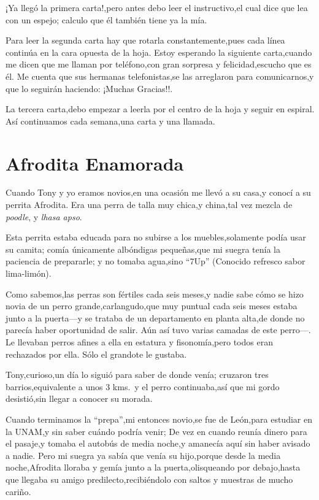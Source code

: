 \documentclass[letterpaper,12pt]{book}
\begin{document}
¡Ya llegó la primera carta!,pero antes debo leer el instructivo,el cual dice que lea con un espejo; calculo que él también tiene ya la mía. 

Para leer la segunda carta hay que rotarla constantemente,pues cada línea continúa en la cara opuesta de la hoja. Estoy esperando la siguiente carta,cuando me dicen que me llaman por teléfono,con gran sorpresa y felicidad,escucho que es él. Me cuenta que sus hermanas telefonistas,se las arreglaron para comunicarnos,y que lo seguirán haciendo: ¡Muchas Gracias!!.

La tercera carta,debo empezar a leerla por el centro de la hoja y seguir en espiral. Así continuamos cada semana,una carta y una llamada. 

\chapter{Afrodita Enamorada}
Cuando Tony y yo eramos novios,en una ocasión me llevó a su casa,y conocí a su perrita Afrodita. Era una perra de talla muy chica,y china,tal vez mezcla de {\it poodle}, y {\it lhasa apso}. 

Esta perrita estaba educada para no subirse a los muebles,solamente podía usar su camita; comía únicamente albóndigas pequeñas,que mi suegra tenía la paciencia de prepararle; y no tomaba agua,sino ``7Up'' (Conocido refresco sabor lima-limón).

Como sabemos,las perras son fértiles cada seis meses,y nadie sabe cómo se hizo novia de un perro grande,carlangudo,que muy puntual cada seis meses estaba junto a la puerta---y se trataba de un departamento en planta alta,de donde no parecía haber oportunidad de salir. Aún así tuvo varias camadas de este perro---. Le llevaban perros afines a ella en estatura y fisonomía,pero todos eran rechazados por ella. Sólo el grandote le gustaba.

Tony,curioso,un día lo siguió para saber de donde venía; cruzaron tres barrios,equivalente a unos 3 kms.\ y el perro continuaba,así que mi gordo desistió,sin llegar a conocer su morada.

Cuando terminamos la ``prepa'',mi entonces novio,se fue de León,para estudiar en la UNAM,y sin saber cuándo podría venir; De vez en cuando reunía dinero para el pasaje,y tomaba el autobús de media noche,y amanecía aquí sin haber avisado a nadie. Pero mi suegra ya sabía que venía su hijo,porque desde la media noche,Afrodita lloraba y gemía junto a la puerta,olisqueando por debajo,hasta que llegaba su amigo predilecto,recibiéndolo con saltos y muestras de mucho cariño.
\end{document}
